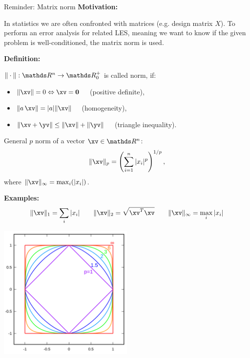 \begin{vbframe}{Reminder: Matrix norm}
\vspace*{-0.1cm}
\textbf{Motivation:}

In statistics we are often confronted with matrices (e.g. design matrix $X$). To perform an error analysis for related LES, meaning we want to know if the given problem is well-conditioned, the matrix norm is used.

\lz
\vspace*{-0.1cm}
\textbf{Definition:}

$\|\cdot\| : \R^n \rightarrow \R^+_0$ is called norm, if:
\begin{itemize}
\item $\|\xv\| = 0 \Leftrightarrow \xv = \mathbf{0} \quad$ (positive definite),
\item $\|a \, \xv\| = |a|\|\xv\| \quad$ (homogeneity),
\item $\|\xv + \yv\| \leq \|\xv\| + \|\yv\| \quad$ (triangle inequality).
\end{itemize}
\medskip 

General $p$ norm of a vector $\xv \in \R^n$:
$$
\|\xv\|_p = \left(\sum\limits_{i=1}^n |x_i|^p\right)^{1/p},
$$
where $\|\xv\|_\infty = \max_i (|x_i|)$.\\
\medskip

\framebreak

\textbf{Examples:}
$$
\|\xv\|_1 = \sum_i |x_i| \qquad  \|\xv\|_2 = \sqrt{\xv^T\xv}
\qquad  \|\xv\|_\infty = \max_i |x_i|
$$

\vspace*{-.6cm}

\begin{center}
\includegraphics[width=0.5\textwidth]{figure_man/pnorm.png}
\end{center}


\end{vbframe}
